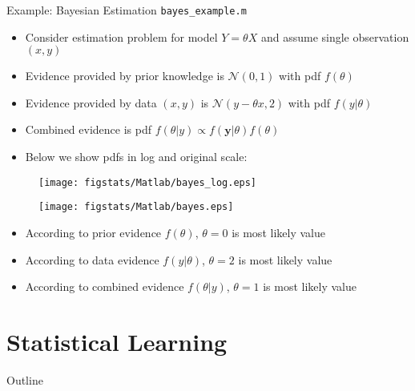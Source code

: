\documentclass[handout,9pt]{beamer}
\begin{document}
%
\begin{frame}{Example: Bayesian Estimation \footnotesize{\texttt{bayes\_example.m}}}

\begin{itemize}
\item Consider estimation problem for model $Y=\theta X$ and assume single observation $(x,y)$
\item Evidence provided by prior knowledge is $\mathcal{N}(0,1)$ with pdf $f(\theta)$
\item Evidence provided by data $(x,y)$ is $\mathcal{N}(y-\theta x,2)$ with pdf $f(y|\theta)$
\item Combined evidence is pdf $f(\theta|y)\propto f(\mathbf{y}|\theta)f(\theta)$
\item Below we show pdfs in log and original scale:
\end{itemize}

\begin{figure}[!htb]
    \centering
	\texttt{[image: figstats/Matlab/bayes\_log.eps]}
\end{figure}
\vspace{-0.2in}
\begin{figure}[!htb]
    \centering
	\texttt{[image: figstats/Matlab/bayes.eps]}
\end{figure}
\pause
\begin{itemize}
\item According to prior evidence $f(\theta)$, $\theta=0$ is most likely value
\item According to data evidence $f(y|\theta)$, $\theta=2$ is most likely value 
\item According to combined evidence $f(\theta|y)$, $\theta=1$ is most likely value 
\end{itemize}

\end{frame}

\section{Statistical Learning}
\begin{frame}{Outline}
\tableofcontents[currentsection]
\end{frame}
\end{document}
